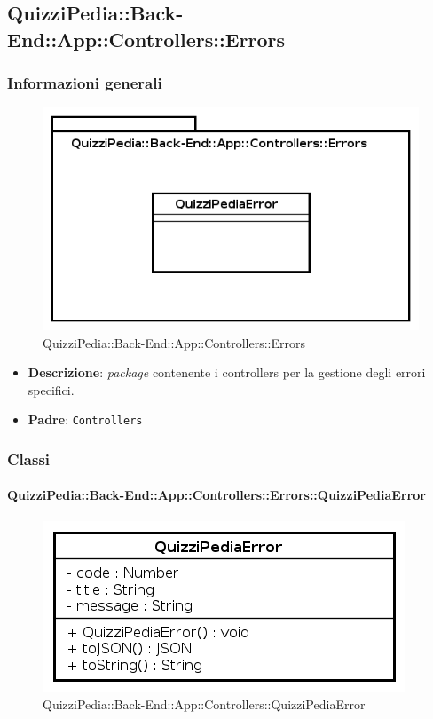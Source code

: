 \subsection{QuizziPedia::Back-End::App::Controllers::Errors}
\subsubsection{Informazioni generali}
\label{QuizziPedia::Back-End::App::Controllers::Errors}
\begin{figure}[ht]
	\centering
	\includegraphics[scale=0.45]{UML/Package/QuizziPedia_Back-End_App_Controllers_Errors.png}
	\caption{QuizziPedia::Back-End::App::Controllers::Errors}
\end{figure}
\FloatBarrier


	\begin{itemize}
		\item \textbf{Descrizione}:
		\textit{package} contenente i controllers per la gestione degli errori specifici.
		\item \textbf{Padre}: \texttt{Controllers}
	\end{itemize}
\subsubsection{Classi}
\paragraph{QuizziPedia::Back-End::App::Controllers::Errors::QuizziPediaError}
\begin{figure}[ht]
	\centering
	\includegraphics[scale=0.45]{UML/Classi/Back-End/QuizziPedia_Back-End_App_Controllers_Errors_QuizziPediaError.png}
	\caption{QuizziPedia::Back-End::App::Controllers::QuizziPediaError}
\end{figure}
\FloatBarrier


